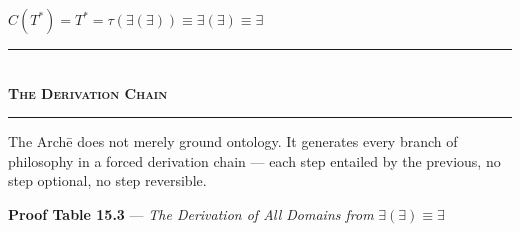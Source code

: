 \documentclass[10pt, openany, oneside]{book}
\renewcommand{\normalsize}{\fontsize{10}{13}\selectfont}
\begin{document}
\begin{center}
    $C(T^*) = T^* = \tau(\exists(\exists)) \equiv \exists(\exists) \equiv \exists$
\end{center}

\vspace{1.5em}


\pagebreak

\begin{center}
    \rule{0.3\textwidth}{0.4pt}\\[0.5em]
    {\normalsize\bfseries\scshape The Derivation Chain}\\[0.3em]
    \rule{0.3\textwidth}{0.4pt}
\end{center}

\vspace{0.5em}

\noindent The Arch\={e} does not merely ground ontology. It generates every branch of philosophy in a forced derivation chain --- each step entailed by the previous, no step optional, no step reversible.

\vspace{0.3em}

\textbf{Proof Table 15.3} --- \textit{The Derivation of All Domains from} $\exists(\exists) \equiv \exists$

\vspace{0.5em}
\end{document}
